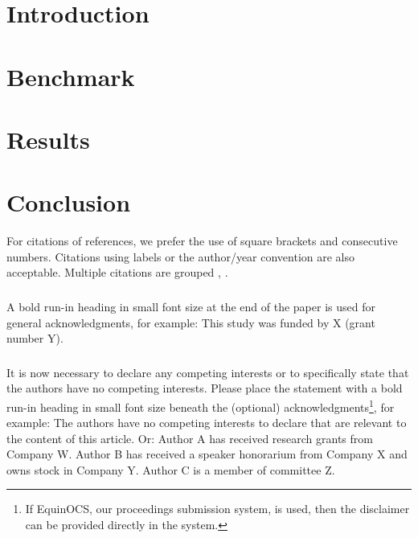 \documentclass[runningheads]{llncs}
\begin{document}
\section{Introduction}


\section{Benchmark}


\section{Results}


\section{Conclusion}



For citations of references, we prefer the use of square brackets
and consecutive numbers. Citations using labels or the author/year
convention are also acceptable. Multiple citations are grouped
\cite{chen2024deep},
\cite{basser1994mr}.

    

\begin{credits}
\subsubsection{\ackname} A bold run-in heading in small font size at the end of the paper is
used for general acknowledgments, for example: This study was funded
by X (grant number Y).

\subsubsection{\discintname}
It is now necessary to declare any competing interests or to specifically
state that the authors have no competing interests. Please place the
statement with a bold run-in heading in small font size beneath the
(optional) acknowledgments\footnote{If EquinOCS, our proceedings submission
system, is used, then the disclaimer can be provided directly in the system.},
for example: The authors have no competing interests to declare that are
relevant to the content of this article. Or: Author A has received research
grants from Company W. Author B has received a speaker honorarium from
Company X and owns stock in Company Y. Author C is a member of committee Z.
\end{credits}
\end{document}

